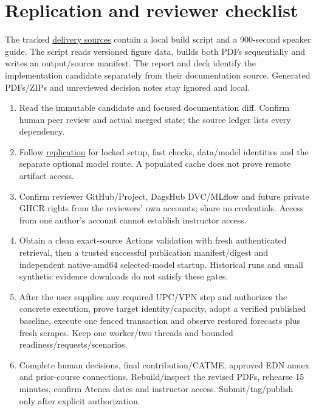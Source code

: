 \documentclass[a4paper,11pt]{article}
\newcommand{\repo}{https://github.com/mlops-2627q1-mds-upc/MLOps_Endesa}
\newcommand{\candidate}{f9b5896af998331494175733c557e8dc5dd12cc7}
\newcommand{\file}[2]{\href{\repo/blob/\candidate/#1}{#2}}
\begin{document}
\clearpage
\section{Replication and reviewer checklist}

The tracked \href{\repo/tree/docs/85-final-delivery/docs/delivery}{delivery sources}
contain a local build script and a 900-second speaker guide. The script reads
versioned figure data, builds both PDFs sequentially and writes an output/source
manifest. The report and deck identify the implementation candidate separately
from their documentation source. Generated PDFs/ZIPs and unreviewed decision
notes stay ignored and local.

\begin{enumerate}
\item Read the immutable candidate and focused documentation diff. Confirm human
peer review and actual merged state; the source ledger lists every dependency.
\item Follow \file{docs/replication.md}{replication} for locked setup, fast checks,
data/model identities and the separate optional model route. A populated cache
does not prove remote artifact access.
\item Confirm reviewer GitHub/Project, DagsHub DVC/MLflow and future private GHCR
rights from the reviewers' own accounts; share no credentials. Access from one
author's account cannot establish instructor access.
\item Obtain a clean exact-source Actions validation with fresh authenticated
retrieval, then a trusted successful publication manifest/digest and independent
native-amd64 selected-model startup. Historical runs and small synthetic evidence
downloads do not satisfy these gates.
\item After the user supplies any required UPC/VPN step and authorizes the concrete
execution, prove target identity/capacity, adopt a verified published baseline,
execute one fenced transaction and observe restored forecasts plus fresh scrapes.
Keep one worker/two threads and bounded readiness/requests/scenarios.
\item Complete human decisions, final contribution/CATME, approved EDN annex and
prior-course connections. Rebuild/inspect the revised PDFs, rehearse 15 minutes,
confirm Atenea dates and instructor access. Submit/tag/publish only after explicit
authorization.
\end{enumerate}
\end{document}
